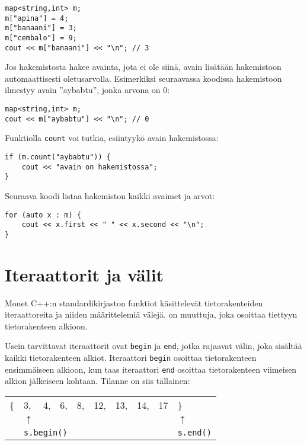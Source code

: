 \begin{lstlisting}
map<string,int> m;
m["apina"] = 4;
m["banaani"] = 3;
m["cembalo"] = 9;
cout << m["banaani"] << "\n"; // 3
\end{lstlisting}

Jos hakemistosta hakee avainta,
jota ei ole siinä,
avain lisätään hakemistoon
automaattisesti oletusarvolla.
Esimerkiksi seuraavassa koodissa
hakemistoon ilmestyy avain ''aybabtu'',
jonka arvona on 0:

\begin{lstlisting}
map<string,int> m;
cout << m["aybabtu"] << "\n"; // 0
\end{lstlisting}
Funktiolla \texttt{count} voi
tutkia, esiintyykö avain hakemistossa:
\begin{lstlisting}
if (m.count("aybabtu")) {
    cout << "avain on hakemistossa";
}
\end{lstlisting}
Seuraava koodi listaa hakemiston
kaikki avaimet ja arvot:
\begin{lstlisting}
for (auto x : m) {
    cout << x.first << " " << x.second << "\n";
}
\end{lstlisting}

\section{Iteraattorit ja välit}


Monet C++:n standardikirjaston funktiot
käsittelevät tietorakenteiden iteraattoreita
ja niiden määrittelemiä välejä.
 on muuttuja,
joka osoittaa tiettyyn tietorakenteen alkioon.

Usein tarvittavat iteraattorit ovat \texttt{begin}
ja \texttt{end}, jotka rajaavat välin,
joka sisältää kaikki tietorakenteen alkiot.
Iteraattori \texttt{begin} osoittaa
tietorakenteen ensimmäiseen alkioon,
kun taas iteraattori \texttt{end} osoittaa
tietorakenteen viimeisen alkion jälkeiseen kohtaan.
Tilanne on siis tällainen:

\begin{center}
\begin{tabular}{llllllllll}
\{ & 3, & 4, & 6, & 8, & 12, & 13, & 14, & 17 & \} \\
& $\uparrow$ & & & & & & & & $\uparrow$ \\
& \multicolumn{3}{l}{\texttt{s.begin()}} & & & & & & \texttt{s.end()} \\
\end{tabular}
\end{center}

